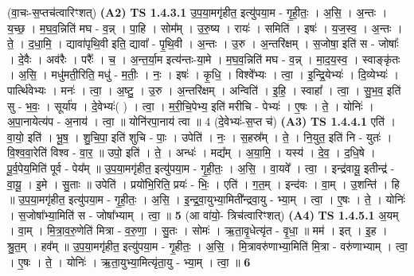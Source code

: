 \documentclass[17pt]{extarticle}
\begin{document}
                  \newline
                      (वा॒चः-स॒प्तच॑त्वारिꣳशत्)  \textbf{(A2)} \newline \newline
                                \textbf{ TS 1.4.3.1} \newline
                  उ॒प॒या॒मगृ॑हीत॒ इत्यु॑पया॒म - गृ॒ही॒तः॒ । अ॒सि॒ । अ॒न्तः । य॒च्छ॒ । म॒घ॒व॒न्निति॑ मघ - व॒न्न् । पा॒हि । सोम᳚म् । उ॒रु॒ष्य । रायः॑ । समिति॑ । इषः॑ । य॒ज॒स्व॒ । अ॒न्तः । ते॒ । द॒धा॒मि॒ । द्यावा॑पृथि॒वी इति॒ द्यावा᳚ - पृ॒थि॒वी । अ॒न्तः । उ॒रु । अ॒न्तरि॑क्षम् । स॒जोषा॒ इति॑ स - जोषाः᳚ । दे॒वैः । अव॑रैः । परैः᳚ । च॒ । अ॒न्त॒र्या॒म इत्य॑न्तः-या॒मे । म॒घ॒व॒न्निति॑ मघ - व॒न्न् । मा॒द॒य॒स्व॒ । स्वाङ्कृ॑तः । अ॒सि॒ । मधु॑मती॒रिति॒ मधु॑ - म॒तीः॒ । नः॒ । इषः॑ । कृ॒धि॒ । विश्वे᳚भ्यः । त्वा॒ । इ॒न्द्रि॒येभ्यः॑ । दि॒व्येभ्यः॑ । पार्त्थि॑वेभ्यः । मनः॑ । त्वा॒ । अ॒ष्टु॒ । उ॒रु । अ॒न्तरि॑क्षम् । अन्विति॑ । इ॒हि॒ । स्वाहा᳚ । त्वा॒ । सु॒भ॒व॒ इति॑ सु - भ॒वः॒ । सूर्या॑य । दे॒वेभ्यः॑( ) । त्वा॒ । म॒री॒चि॒पेभ्य॒ इति॑ मरीचि - पेभ्यः॑ । ए॒षः । ते॒ । योनिः॑ । अ॒पा॒नायेत्य॑प - अ॒नाय॑ । त्वा॒ ॥ \textbf{ } \newline
                  \newline
                      योनि॑रपा॒नाय॑ त्वा ॥ 4 (दे॒वेभ्यः॑-स॒प्त च॑)  \textbf{(A3)} \newline \newline
                                \textbf{ TS 1.4.4.1} \newline
                  एति॑ । वा॒यो॒ इति॑ । भू॒ष॒ । शु॒चि॒पा॒ इति॑ शुचि - पाः॒ । उपेति॑ । नः॒ । स॒हस्र᳚म् । ते॒ । नि॒युत॒ इति॑ नि - युतः॑ । वि॒श्व॒वा॒रेति॑ विश्व - वा॒र॒ ॥ उपो॒ इति॑ । ते॒ । अन्धः॑ । मद्य᳚म् । अ॒या॒मि॒ । यस्य॑ । दे॒व॒ । द॒धि॒षे । पू॒र्व॒पेय॒मिति॑ पूर्व - पेय᳚म् ॥ उ॒प॒या॒मगृ॑हीत॒ इत्यु॑पया॒म - गृ॒ही॒तः॒ । अ॒सि॒ । वा॒यवे᳚ । त्वा॒ । इन्द्र॑वायू॒ इतीन्द्र॑ - वा॒यू॒ । इ॒मे । सु॒ताः ॥ उपेति॑ । प्रयो॑भि॒रिति॒ प्रयः॑ - भिः॒ । एति॑ । ग॒त॒म् । इन्द॑वः । वा॒म् । उ॒शन्ति॑ । हि ॥ उ॒प॒या॒मगृ॑हीत॒ इत्यु॑पया॒म - गृ॒ही॒तः॒ । अ॒सि॒ । इ॒न्द्र॒वा॒युभ्या॒मिती᳚न्द्रवा॒यु - भ्या॒म् । त्वा॒ । ए॒षः । ते॒ । योनिः॑ । स॒जोषा᳚भ्या॒मिति॑ स - जोषा᳚भ्याम् । त्वा॒ ॥ \textbf{  5} \newline
                  \newline
                      (आ वा॑यो॒- त्रिच॑त्वारिꣳशत्)  \textbf{(A4)} \newline \newline
                                \textbf{ TS 1.4.5.1} \newline
                  अ॒यम् । वा॒म् । मि॒त्रा॒व॒रु॒णेति॑ मित्रा - व॒रु॒णा॒ । सु॒तः । सोमः॑ । ऋ॒ता॒वृ॒धेत्यृ॑त - वृ॒धा॒ ॥ मम॑ । इत् । इ॒ह । श्रु॒त॒म् । हव᳚म् ॥ उ॒प॒या॒मगृ॑हीत॒ इत्यु॑पया॒म - गृ॒हीतः॒ । अ॒सि॒ । मि॒त्रावरु॑णाभ्या॒मिति॑ मि॒त्रा - वरु॑णाभ्याम् । त्वा॒ । ए॒षः । ते॒ । योनिः॑ । ऋ॒ता॒युभ्या॒मित्यृ॑ता॒यु - भ्या॒म् । त्वा॒ ॥ \textbf{  6 } \newline
\end{document}
